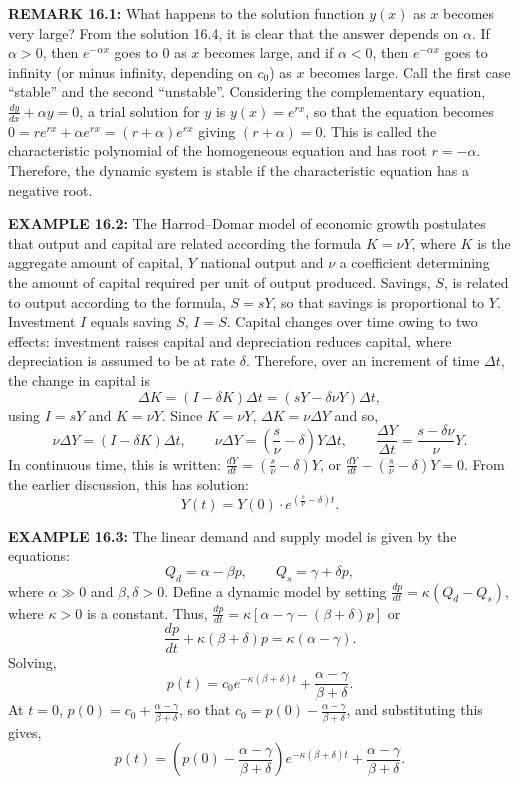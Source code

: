 \begin{original}
\textbf{REMARK 16.1:} What happens to the solution function $y(x)$ as $x$ becomes very large? From the solution 16.4, it is clear that the answer depends on $\alpha$. If $\alpha > 0$, then $e^{-\alpha x}$ goes to $0$ as $x$ becomes large, and if $\alpha < 0$, then $e^{-\alpha x}$ goes to infinity (or minus infinity, depending on $c_0$) as $x$ becomes large. Call the first case ``stable'' and the second ``unstable''. Considering the complementary equation, $\frac{dy}{dx} + \alpha y = 0$, a trial solution for $y$ is $y(x) = e^{rx}$, so that the equation becomes $0 = re^{rx} + \alpha e^{rx} = (r + \alpha)e^{rx}$ giving $(r + \alpha) = 0$. This is called the characteristic polynomial of the homogeneous equation and has root $r = -\alpha$. Therefore, the dynamic system is stable if the characteristic equation has a negative root.

\textbf{EXAMPLE 16.2:} The Harrod--Domar model of economic growth postulates that output and capital are related according the formula $K = \nu Y$, where $K$ is the aggregate amount of capital, $Y$ national output and $\nu$ a coefficient determining the amount of capital required per unit of output produced. Savings, $S$, is related to output according to the formula, $S = sY$, so that savings is proportional to $Y$. Investment $I$ equals saving $S$, $I = S$. Capital changes over time owing to two effects: investment raises capital and depreciation reduces capital, where depreciation is assumed to be at rate $\delta$. Therefore, over an increment of time $\Delta t$, the change in capital is
\[
\Delta K = (I - \delta K)\Delta t = (sY - \delta \nu Y)\Delta t,
\]
using $I = sY$ and $K = \nu Y$. Since $K = \nu Y$, $\Delta K = \nu \Delta Y$ and so,
\[
\nu \Delta Y = (I - \delta K)\Delta t,\qquad \nu \Delta Y = \left(\frac{s}{\nu} - \delta\right)Y \Delta t,\qquad \frac{\Delta Y}{\Delta t} = \frac{s - \delta \nu}{\nu} Y.
\]
In continuous time, this is written: $\frac{dY}{dt} = (\frac{s}{\nu} - \delta) Y$, or $\frac{dY}{dt} - (\frac{s}{\nu} - \delta) Y = 0$. From the earlier discussion, this has solution:
\[
Y(t) = Y(0) \cdot e^{(\frac{s}{\nu} - \delta) t}.
\]

\textbf{EXAMPLE 16.3:} The linear demand and supply model is given by the equations:
\[
Q_d = \alpha - \beta p, \qquad Q_s = \gamma + \delta p,
\]
where $\alpha \gg 0$ and $\beta, \delta > 0$. Define a dynamic model by setting $\frac{dp}{dt} = \kappa(Q_d - Q_s)$, where $\kappa > 0$ is a constant. Thus, $\frac{dp}{dt} = \kappa[\alpha - \gamma - (\beta + \delta)p]$ or
\[
\frac{dp}{dt} + \kappa(\beta + \delta)p = \kappa(\alpha - \gamma).
\]
Solving,
\[
p(t) = c_0 e^{-\kappa(\beta+\delta)t} + \frac{\alpha - \gamma}{\beta + \delta}.
\]
At $t = 0$, $p(0) = c_0 + \frac{\alpha - \gamma}{\beta + \delta}$, so that $c_0 = p(0) - \frac{\alpha - \gamma}{\beta + \delta}$, and substituting this gives,
\[
p(t) = \left(p(0) - \frac{\alpha - \gamma}{\beta + \delta}\right) e^{-\kappa(\beta+\delta)t} + \frac{\alpha - \gamma}{\beta + \delta}.
\]


\end{original}

